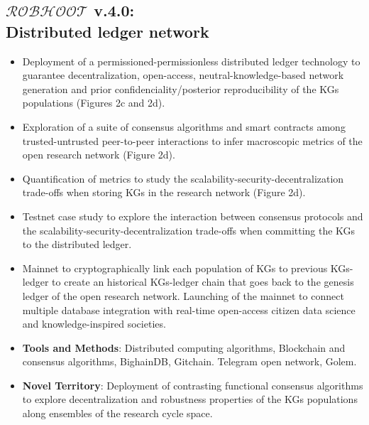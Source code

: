 \documentclass[10pt, a4paper, twocolumn]{article} %
\begin{document}
  \subsection{{\bf $\mathcal{ROBHOOT}$ v.4.0}: \\ Distributed ledger
    network}
  \begin{itemize}
  \item Deployment of a permissioned-permissionless distributed ledger
    technology to guarantee decentralization, open-access,
    neutral-knowledge-based network generation and prior
    confidenciality/posterior reproducibility of the KGs populations
    (Figures 2c and 2d).
  \item Exploration of a suite of consensus algorithms and smart
    contracts among trusted-untrusted peer-to-peer interactions to
    infer macroscopic metrics of the open research network (Figure
    2d).
  \item Quantification of metrics to study the
    scalability-security-decentralization trade-offs when storing KGs
    in the research network (Figure 2d).
  \item Testnet case study to explore the interaction between
    consensus protocols and the scalability-security-decentralization
    trade-offs when committing the KGs to the distributed ledger.
  \item Mainnet to cryptographically link each population of KGs to
    previous KGs-ledger to create an historical KGs-ledger chain that
    goes back to the genesis ledger of the open research
    network. Launching of the mainnet to connect multiple database
    integration with real-time open-access citizen data science and
    knowledge-inspired societies.
  \end{itemize}

   \begin{itemize}
   \item {\bf Tools and Methods}: Distributed computing algorithms,
     Blockchain and consensus algorithms, BighainDB,
     Gitchain. Telegram open network, Golem.
 \end{itemize}

 \begin{itemize}
 \item {\bf Novel Territory}: Deployment of contrasting functional
   consensus algorithms to explore decentralization and robustness
   properties of the KGs populations along ensembles of the research
   cycle space.
   \end{itemize}
  
\end{document}
